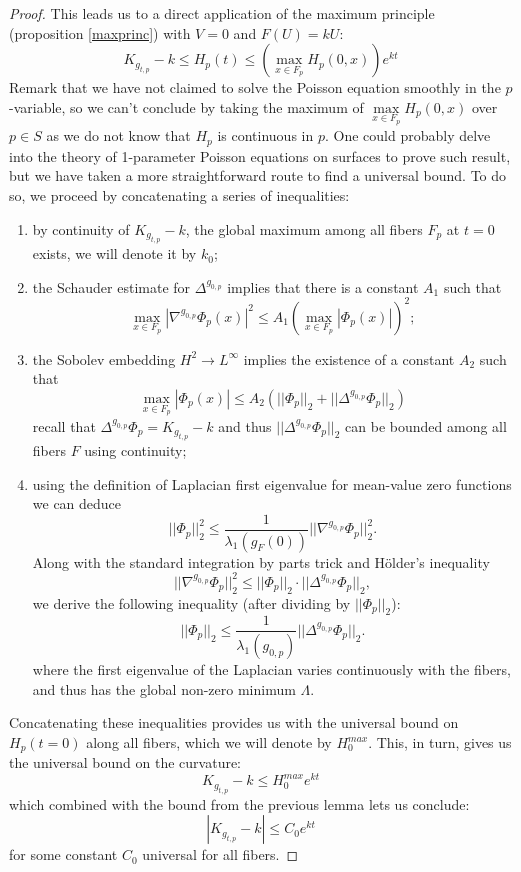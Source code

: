 \documentclass{article}
\theoremstyle{plain}
\theoremstyle{remark}
\theoremstyle{definition}
\begin{document}
\begin{proof}
    This leads us to a direct application of the maximum principle (proposition \ref{maxprinc}) with $V=0$ and $F(U)=kU$\thinspace:
    $$K_{g_{t,p}}-k\leq H_p(t) \leq (\underset{x\in F_p}{\max}H_p(0,x)) e^{kt}$$
    Remark that we have not claimed to solve the Poisson equation smoothly in the $p$-variable, so we can't conclude by taking the maximum of $\underset{x\in F_p}{\max}H_p(0,x)$ over $p\in S$ as we do not know that $H_p$ is continuous in $p$. One could probably delve into the theory of 1-parameter Poisson equations on surfaces to prove such result, but we have taken a more straightforward route to find a universal bound. To do so, we proceed by concatenating a series of inequalities\thinspace:
    \begin{enumerate}
        \item by continuity of $K_{g_{t,p}}-k$, the global maximum among all fibers $F_p$ at $t=0$ exists, we will denote it by $k_0$;
        \item the Schauder estimate for $\Delta^{g_{0,p}}$ implies that there is a constant $A_1$ such that 
        $$\underset{x\in F_p}{\max} |\nabla^{g_{0,p}} \Phi_p(x)|^2 \leq A_1 (\underset{x\in F_p}{\max}|\Phi_p(x)|)^2; $$
        \item the Sobolev embedding $H^2 \to L^\infty$ implies the existence of a constant $A_2$ such that
        $$\underset{x\in F_p}{\max} |\Phi_p(x)| \leq A_2 (||\Phi_p||_2 + ||\Delta^{g_{0,p}}\Phi_p||_2)$$
        recall that $\Delta^{g_{0,p}}\Phi_p = K_{g_{t,p}}-k$ and thus $||\Delta^{g_{0,p}}\Phi_p||_2$ can be bounded among all fibers $F$ using continuity;
        \item using the definition of Laplacian first eigenvalue for mean-value zero functions we can deduce 
        $$||\Phi_p||^2_2 \leq \frac{1}{\lambda_1(g_F(0))} ||\nabla^{g_{0,p}} \Phi_p||_2^2.$$
        Along with the standard integration by parts trick and  H\"older's inequality
        $$||\nabla^{g_{0,p}} \Phi_p||_2^2 \leq ||\Phi_p||_2 \cdot ||\Delta^{g_{0,p}} \Phi_p||_2,  $$
        we derive the following inequality (after dividing by $|| \Phi_p||_2$)\thinspace: 
        $$||\Phi_p||_2 \leq \frac{1}{\lambda_1(g_{0,p})} ||\Delta^{g_{0,p}} \Phi_p||_2.$$
        where the first eigenvalue of the Laplacian varies continuously with the fibers, and thus has the global non-zero minimum $\Lambda$.
    \end{enumerate}
    Concatenating these inequalities provides us with the universal bound on $H_p(t=0)$ along all fibers, which we will denote by $H_0^{max}$. This, in turn, gives us the universal bound on the curvature\thinspace: 
    $$K_{g_{t,p}}-k \leq H^{max}_0 e^{kt}$$
    which combined with the bound from the previous lemma lets us conclude\thinspace: 
    $$|K_{g_{t,p}}-k| \leq C_0 e^{kt}$$
    for some constant $C_0$ universal for all fibers. 
\end{proof}
\end{document}
